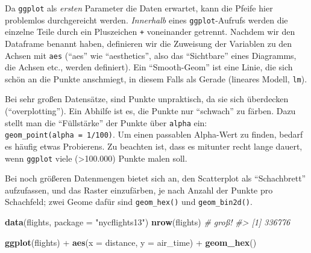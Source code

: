 \documentclass[12pt,ngerman,]{book}
\makeatletter
\newenvironment{Shaded}{\begin{snugshade}}{\end{snugshade}}
\newcommand{\KeywordTok}[1]{\textcolor[rgb]{0.13,0.29,0.53}{\textbf{{#1}}}}
\newcommand{\DataTypeTok}[1]{\textcolor[rgb]{0.13,0.29,0.53}{{#1}}}
\newcommand{\DecValTok}[1]{\textcolor[rgb]{0.00,0.00,0.81}{{#1}}}
\newcommand{\StringTok}[1]{\textcolor[rgb]{0.31,0.60,0.02}{{#1}}}
\newcommand{\CommentTok}[1]{\textcolor[rgb]{0.56,0.35,0.01}{\textit{{#1}}}}
\newcommand{\NormalTok}[1]{{#1}}
\newenvironment{kframe}{%
\medskip{}
\setlength{\fboxsep}{.8em}
 \def\at@end@of@kframe{}%
 \ifinner\ifhmode%
  \def\at@end@of@kframe{\end{minipage}}%
  \begin{minipage}{\columnwidth}%
 \fi\fi%
 \def\FrameCommand##1{\hskip\@totalleftmargin \hskip-\fboxsep
 \colorbox{shadecolor}{##1}\hskip-\fboxsep
     \hskip-\linewidth \hskip-\@totalleftmargin \hskip\columnwidth}%
 \MakeFramed {\advance\hsize-\width
   \@totalleftmargin\z@ \linewidth\hsize
   \@setminipage}}%
 {\par\unskip\endMakeFramed%
 \at@end@of@kframe}
\renewenvironment{Shaded}{\begin{kframe}}{\end{kframe}}
\makeatother
\begin{document}
\begin{Shaded}
\end{Shaded}

Da \texttt{ggplot} als \emph{ersten} Parameter die Daten erwartet, kann
die Pfeife hier problemlos durchgereicht werden. \emph{Innerhalb} eines
\texttt{ggplot}-Aufrufs werden die einzelne Teile durch ein Pluszeichen
\texttt{+} voneinander getrennt. Nachdem wir den Dataframe benannt
haben, definieren wir die Zuweisung der Variablen zu den Achsen mit
\texttt{aes} (``aes'' wie ``aesthetics'', also das ``Sichtbare'' eines
Diagramms, die Achsen etc., werden definiert). Ein ``Smooth-Geom'' ist
eine Linie, die sich schön an die Punkte anschmiegt, in diesem Falls als
Gerade (lineares Modell, \texttt{lm}).

Bei sehr großen Datensätze, sind Punkte unpraktisch, da sie sich
überdecken (``overplotting''). Ein Abhilfe ist es, die Punkte nur
``schwach'' zu färben. Dazu stellt man die ``Füllstärke'' der Punkte
über \texttt{alpha} ein: \texttt{geom\_point(alpha\ =\ 1/100)}. Um einen
passablen Alpha-Wert zu finden, bedarf es häufig etwas Probierens. Zu
beachten ist, dass es mitunter recht lange dauert, wenn \texttt{ggplot}
viele (\textgreater{}100.000) Punkte malen soll.

Bei noch größeren Datenmengen bietet sich an, den Scatterplot als
``Schachbrett'' aufzufassen, und das Raster einzufärben, je nach Anzahl
der Punkte pro Schachfeld; zwei Geome dafür sind \texttt{geom\_hex()}
und \texttt{geom\_bin2d()}.

\begin{Shaded}
\begin{Highlighting}[]
\KeywordTok{data}\NormalTok{(flights, }\DataTypeTok{package =} \StringTok{"nycflights13"}\NormalTok{)}
\KeywordTok{nrow}\NormalTok{(flights)  }\CommentTok{# groß!}
\CommentTok{#> [1] 336776}

\KeywordTok{ggplot}\NormalTok{(flights) +}
\StringTok{  }\KeywordTok{aes}\NormalTok{(}\DataTypeTok{x =} \NormalTok{distance, }\DataTypeTok{y =} \NormalTok{air_time) +}
\StringTok{  }\KeywordTok{geom_hex}\NormalTok{()}
\end{Highlighting}
\end{Shaded}
\end{document}
